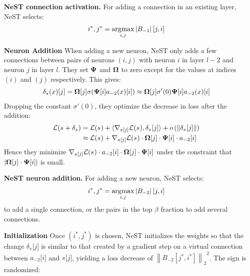 \begin{proposition}\label{prop:nest_connection}

\textbf{NeST connection activation.} For adding a connection in an
existing layer, NeST selects:
\[i^{\ast},j^{\ast} = \operatorname*{\arg\!\max}_{i,j}\left| B_{- 1} \right|\lbrack j,i\rbrack\]

\end{proposition}

\noindent\textbf{Neuron Addition}
When adding a new neuron, NeST only adds a few connections between pairs
of neurons \((i,j)\) with neuron \(i\) in layer \(l - 2\) and neuron
\(j\) in layer \(l\). They set \(\boldsymbol{\Psi}{}\) and \(\boldsymbol{\Omega}{}\) to zero
except for the values at indices \((i)\) and \((j)\) respectively. This
gives:
\[\delta_{s_{}}(x)\lbrack j\rbrack = \boldsymbol{\Omega}{}\lbrack j\rbrack\sigma(\boldsymbol{\Psi}{}\lbrack i\rbrack a_{- 2}(x)\lbrack i\rbrack) \approx \boldsymbol{\Omega}{}\lbrack j\rbrack\sigma'(0)\boldsymbol{\Psi}{}\lbrack i\rbrack a_{- 2}(x)\lbrack i\rbrack\]
Dropping the constant \(\sigma'(0)\), they optimize the decrease in loss
after the addition: \[\begin{aligned}
\mathcal{L}(s_{} + \delta_{s_{}}) & = \mathcal{L}(s_{}) + {\langle\nabla_{s_{}\lbrack j\rbrack}\mathcal{L}(s_{}),\delta_{s_{}}\lbrack j\rbrack\rangle} + o\left( \left\| {\delta_{s_{}}\lbrack j\rbrack} \right\| \right) \\
 & \approx \mathcal{L}(s_{}) + \nabla_{s_{}\lbrack j\rbrack}\mathcal{L}(s_{}) \cdot \boldsymbol{\Omega}{}\lbrack j\rbrack \cdot \boldsymbol{\Psi}{}\lbrack i\rbrack \cdot a_{- 2}\lbrack i\rbrack
\end{aligned}\]
Hence they minimize
\(\nabla_{s_{}\lbrack j\rbrack}\mathcal{L}(s_{}) \cdot a_{- 2}\lbrack i\rbrack \cdot \boldsymbol{\Omega}{}\lbrack j\rbrack \cdot \boldsymbol{\Psi}{}\lbrack i\rbrack\)
under the constraint that
\(\left| {\boldsymbol{\Omega}{}\lbrack j\rbrack \cdot \boldsymbol{\Psi}{}\lbrack i\rbrack} \right|\)
is small.

\begin{proposition}\label{prop:nest_objective}

\textbf{NeST neuron addition.} For adding a new neuron, NeST selects:
\begin{equation}\label{eq:nest_neuron_metric}
i^{\ast},j^{\ast} = \operatorname*{\arg\!\max}_{i,j}\left| B_{- 2} \right|\lbrack j,i\rbrack
\end{equation}
to add a single connection, or the pairs in the top \(\beta\) fraction
to add several connections.

\end{proposition}

\noindent\textbf{Initialization} Once \(\left( i^{\ast},j^{\ast} \right)\) is chosen, NeST initializes the weights so that the change \(\delta_{s_{}}\lbrack j\rbrack\) is similar to that created by a gradient step on a virtual connection
between \(a_{- 2}\lbrack i\rbrack\) and \(s_{}\lbrack j\rbrack\), yielding a loss decrease of \({\left\| {B_{- 2}\left\lbrack j^{\ast},i^{\ast} \right\rbrack} \right\|_{2}}^{2}\). The sign is randomized:

